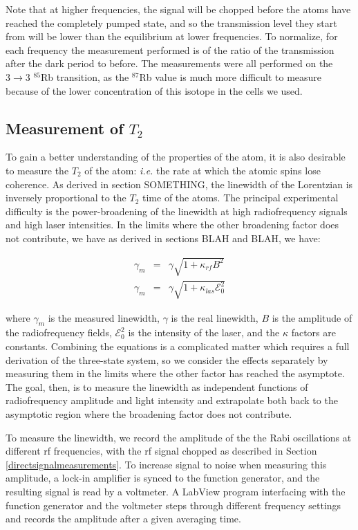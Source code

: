 Note that at higher frequencies, the signal will be chopped before the atoms have reached the completely pumped state, and so the transmission level they start from will be lower than the equilibrium at lower frequencies. To normalize, for each frequency the measurement performed is of the ratio of the transmission after the dark period to before. The measurements were all performed on the $3\rightarrow3$ $^{85}$Rb transition, as the $^{87}$Rb value is much more difficult to measure because of the lower concentration of this isotope in the cells we used.

\subsection{Measurement of $T_{2}$} \label{measurementoft2}

To gain a better understanding of the properties of the atom, it is also desirable to measure the $T_{2}$ of the atom: \emph{i.e.} the rate at which the atomic spins lose coherence. As derived in section SOMETHING, the linewidth of the Lorentzian is inversely proportional to the $T_{2}$ time of the atoms. The principal experimental difficulty is the power-broadening of the linewidth at high radiofrequency signals and high laser intensities. In the limits where the other broadening factor does not contribute, we have as derived in sections BLAH and BLAH, we have:

\begin{eqnarray}
\gamma_{m} &=& \gamma \sqrt{1+ \kappa_{rf} B^{2}} \label{eq:rfbroad}\\
\gamma_{m} &=&\gamma \sqrt{1+ \kappa_{las} \mathcal{E}_{0}^{2}} \label{eq:lightbroad}
\end{eqnarray}

where $\gamma_{m}$ is the measured linewidth, $\gamma$ is the real linewidth, $B$ is the amplitude of the radiofrequency fields, $\mathcal{E}_{0}^{2}$ is the intensity of the laser, and the $\kappa$ factors are constants. Combining the equations is a complicated matter which requires a full derivation of the three-state system, so we consider the effects separately by measuring them in the limits where the other factor has reached the asymptote. The goal, then, is to measure the linewidth as independent functions of radiofrequency amplitude and light intensity and extrapolate both back to the asymptotic region where the broadening factor does not contribute.

To measure the linewidth, we record the amplitude of the the Rabi oscillations at different rf frequencies, with the rf signal chopped as described in Section \ref{directsignalmeasurements}. To increase signal to noise when measuring this amplitude, a lock-in amplifier is synced to the function generator, and the resulting signal is read by a voltmeter. A LabView program interfacing with the function generator and the voltmeter steps through different frequency settings and records the amplitude after a given averaging time.

